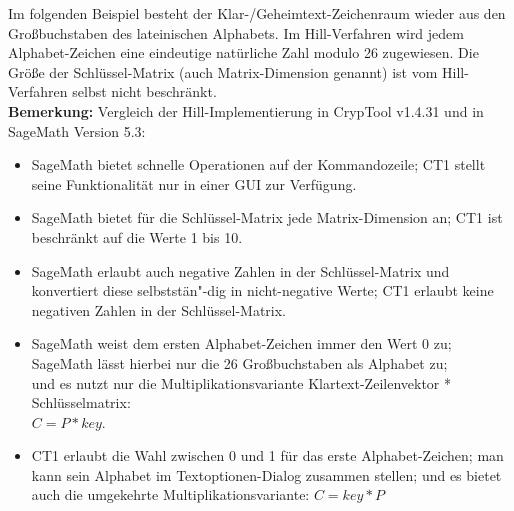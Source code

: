 \begin{refsegment}
Im folgenden Beispiel besteht der Klar-/Geheimtext-Zeichenraum wieder
aus den Großbuchstaben des lateinischen Alphabets. Im Hill-Verfahren wird
jedem Alphabet-Zeichen eine eindeutige natürliche Zahl modulo 26 zugewiesen.
Die Größe der Schlüssel-Matrix (auch Matrix-Dimension genannt) ist vom
Hill-Verfahren selbst nicht beschränkt.\\

\textbf{Bemerkung:} Vergleich der Hill-Implementierung in
CrypTool v1.4.31 und in SageMath Version 5.3:
\begin{itemize}
  \item SageMath bietet schnelle Operationen auf der Kommandozeile;
        CT1 stellt seine Funktionalität nur in einer GUI zur Verfügung.
  \item SageMath bietet für die Schlüssel-Matrix jede Matrix-Dimension an;
        CT1 ist beschränkt auf die Werte 1 bis 10.
  \item SageMath erlaubt auch negative Zahlen in der Schlüssel-Matrix
        und konvertiert diese selbststän"-dig in nicht-negative Werte;
        CT1 erlaubt keine negativen Zahlen in der Schlüssel-Matrix.
  \item SageMath weist dem ersten Alphabet-Zeichen immer den Wert 0 zu;\\
        SageMath lässt hierbei nur die 26 Großbuchstaben als Alphabet zu;\\
        und es nutzt nur die Multiplikationsvariante
        Klartext-Zeilenvektor * Schlüsselmatrix:\\
        $C = P * key$.
  \item CT1 erlaubt die Wahl zwischen 0 und 1 für das erste
        Alphabet-Zeichen; man kann sein Alphabet im Textoptionen-Dialog
        zusammen stellen; und es bietet auch die umgekehrte
        Multiplikationsvariante: $C = key * P$
\end{itemize}


\end{refsegment}
